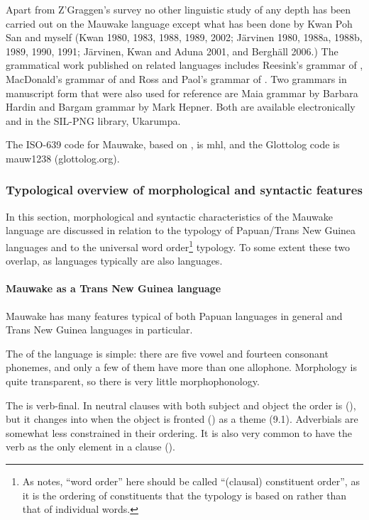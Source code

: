 Apart from Z'Graggen's survey no other linguistic study of any depth has been carried out on the Mauwake language except what has been done by Kwan Poh San and myself (Kwan 1980, 1983, 1988, 1989, 2002; J\"arvinen 1980, 1988a, 1988b, 1989, 1990, 1991; J\"arvinen, Kwan and Aduna 2001, and Bergh\"all 2006.)  The grammatical work published on related languages includes Reesink's grammar of \citet{Usan1987}, MacDonald's grammar of \citet{Tauya1990} and Ross and Paol's grammar of \citet{Waskia1978}. Two grammars in manuscript form that were also used for reference are Maia grammar by Barbara Hardin and Bargam grammar by Mark Hepner. Both are available electronically and in the SIL-PNG library, Ukarumpa.

The ISO-639 code for Mauwake, based on \citet{Grimes2000}, is mhl, and the Glottolog code is mauw1238 (glottolog.org).

\subsubsection{Typological overview of morphological and syntactic features}
\hypertarget{RefHeading18601935131865}{}In this section, morphological and syntactic characteristics of the Mauwake language are discussed in relation to the typology of Papuan/Trans New Guinea languages and to the universal word order\footnote{As \citet[72]{Dixon2009} notes, ``word order'' here should be called ``(clausal) constituent order'', as it is the ordering of constituents that the typology is based on rather than that of individual words.}  typology.  To some extent these two overlap, as  languages typically are also  languages.

\paragraph[Mauwake as a Trans New Guinea language]{Mauwake as a Trans New Guinea language}
\hypertarget{RefHeading18621935131865}{}Mauwake has many features typical of both Papuan languages in general and Trans New Guinea languages in particular. 

The  of the language is simple: there are five vowel and fourteen consonant phonemes, and only a few of them have more than one allophone.  Morphology is quite transparent, so there is very little morphophonology.

The  is verb-final. In neutral clauses with both subject and object the order is  (), but it changes into  when the object is fronted () as a theme (9.1).  Adverbials are somewhat less constrained in their ordering. It is also very common to have the verb as the only element in a clause (). 

